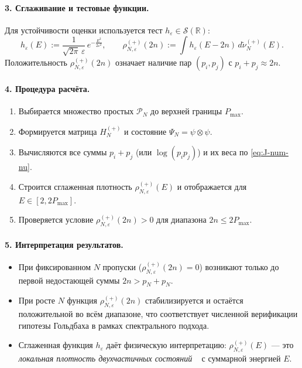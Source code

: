 \documentclass{article}
\numberwithin{equation}{section}
\theoremstyle{plain}
\theoremstyle{definition}
\theoremstyle{remark}
\def\rho{ρ}\def\sigma{σ}\def\Sigma{Σ}\def\tau{τ}%
\begin{document}
\paragraph{3. Сглаживание и тестовые функции.}
Для устойчивости оценки используется тест \(h_\varepsilon\in\mathcal S(\mathbb R)\):
\begin{equation}\label{eq:J-test}
h_\varepsilon(E) := \frac{1}{\sqrt{2\pi}\,\varepsilon}\, e^{-\tfrac{E^2}{2\varepsilon^2}},\qquad
\rho^{(+)}_{N,\varepsilon}(2n)
:= \int h_\varepsilon(E-2n)\, d\tilde\nu^{(+)}_N(E).
\end{equation}
Положительность \(\rho^{(+)}_{N,\varepsilon}(2n)\) означает наличие пар \((p_i,p_j)\) с \(p_i+p_j\approx 2n\).

\paragraph{4. Процедура расчёта.}
\begin{enumerate}
\item Выбирается множество простых \(\mathcal P_N\) до верхней границы \(P_{\max}\).
\item Формируется матрица \(H^{(+)}_N\) и состояние \(\Psi_N=\psi\otimes\psi\).
\item Вычисляются все суммы \(p_i+p_j\) (или \(\log(p_i p_j)\)) и их веса по \eqref{eq:J-num-nu}.
\item Строится сглаженная плотность \(\rho^{(+)}_{N,\varepsilon}(E)\) и отображается для \(E\in[2,2P_{\max}]\).
\item Проверяется условие \(\rho^{(+)}_{N,\varepsilon}(2n)>0\) для диапазона \(2n\le 2P_{\max}\).
\end{enumerate}

\paragraph{5. Интерпретация результатов.}
\begin{itemize}
\item При фиксированном \(N\) пропуски (\(\rho^{(+)}_{N,\varepsilon}(2n)=0\)) возникают только до первой недостающей суммы \(2n>p_N+p_N\).
\item При росте \(N\) функция \(\rho^{(+)}_{N,\varepsilon}(2n)\) стабилизируется и остаётся положительной во всём диапазоне,
что соответствует численной верификации гипотезы Гольдбаха в рамках спектрального подхода.
\item Сглаженная функция \(h_\varepsilon\) даёт физическую интерпретацию:
\(\rho^{(+)}_{N,\varepsilon}(E)\) — это \emph{локальная плотность двухчастичных состояний} ~\cite{Haake2010, Gutzwiller1990}
с суммарной энергией \(E\).
\end{itemize}
\end{document}
